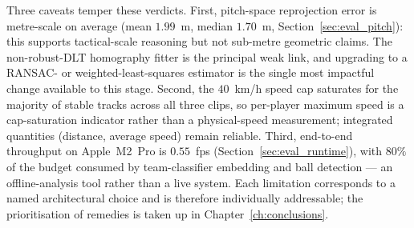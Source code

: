 Three caveats temper these verdicts. First, pitch-space reprojection
error is metre-scale on average (mean $1.99$~m, median $1.70$~m,
Section~\ref{sec:eval_pitch}): this supports tactical-scale reasoning
but not sub-metre geometric claims. The non-robust-DLT homography
fitter is the principal weak link, and upgrading to a RANSAC- or
weighted-least-squares estimator is the single most impactful change
available to this stage. Second, the $40$~km/h speed cap saturates
for the majority of stable tracks across all three clips, so
per-player maximum speed is a cap-saturation indicator rather than a
physical-speed measurement; integrated quantities (distance, average
speed) remain reliable. Third, end-to-end throughput on Apple~M2~Pro
is $0.55$~fps (Section~\ref{sec:eval_runtime}), with $80\%$ of the
budget consumed by team-classifier embedding and ball detection ---
an offline-analysis tool rather than a live system. Each limitation
corresponds to a named architectural choice and is therefore
individually addressable; the prioritisation of remedies is taken up
in Chapter~\ref{ch:conclusions}.